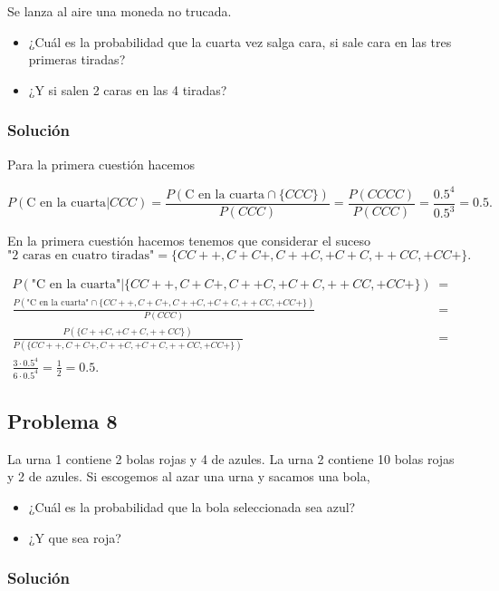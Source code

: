 \documentclass[
]{article}
\providecommand{\tightlist}{%
  \setlength{\itemsep}{0pt}\setlength{\parskip}{0pt}}
\begin{document}
Se lanza al aire una moneda no trucada.

\begin{itemize}
\tightlist
\item
  ¿Cuál es la probabilidad que la cuarta vez salga cara, si sale cara en
  las tres primeras tiradas?
\item
  ¿Y si salen 2 caras en las 4 tiradas?
\end{itemize}

\hypertarget{soluciuxf3n-7}{%
\subsubsection{Solución}\label{soluciuxf3n-7}}

Para la primera cuestión hacemos

\[
P(\mbox{C en la cuarta}|CCC)=
\frac{P(\mbox{C en la cuarta}\cap \{CCC\})}{P(CCC)}=
\frac{P(CCCC)}{P(CCC)}=\frac{0.5^4}{0.5^3}=0.5
.
\]

En la primera cuestión hacemos tenemos que considerar el suceso
\[\mbox{"2 caras en cuatro tiradas"}=\{CC++,C+C+,C++C,+C+C,++CC,+CC+\}.\]

\begin{eqnarray*}
P(\mbox{"C en la cuarta"}|\{CC++,C+C+,C++C,+C+C,++CC,+CC+\})&=&\\
\frac{P(\mbox{"C en la cuarta"}\cap \{CC++,C+C+,C++C,+C+C,++CC,+CC+\})}{P(CCC)}&=&
\\
\frac{P(\{C++C,+C+C,++CC\})}{P(\{CC++,C+C+,C++C,+C+C,++CC,+CC+\})}&=&
\\
\frac{3\cdot 0.5^4}{6\cdot 0.5^4}=\frac{1}{2}=0.5.
\end{eqnarray*}

\hypertarget{problema-8}{%
\subsection{Problema 8}\label{problema-8}}

La urna 1 contiene 2 bolas rojas y 4 de azules. La urna 2 contiene 10
bolas rojas y 2 de azules. Si escogemos al azar una urna y sacamos una
bola,

\begin{itemize}
\tightlist
\item
  ¿Cuál es la probabilidad que la bola seleccionada sea azul?
\item
  ¿Y que sea roja?
\end{itemize}

\hypertarget{soluciuxf3n-8}{%
\subsubsection{Solución}\label{soluciuxf3n-8}}
\end{document}
